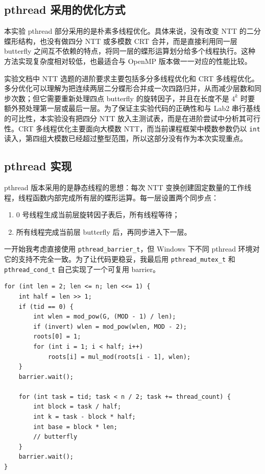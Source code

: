 \documentclass[a4paper,12pt]{ctexart}
\begin{document}
\subsection{pthread 采用的优化方式}

本实验 pthread 部分采用的是朴素多线程优化。具体来说，没有改变 NTT 的二分蝶形结构，也没有做四分 NTT 或多模数 CRT 合并，而是直接利用同一层 butterfly 之间互不依赖的特点，将同一层的蝶形运算划分给多个线程执行。这种方法实现复杂度相对较低，也最适合与 OpenMP 版本做一一对应的性能比较。

实验文档中 NTT 选题的进阶要求主要包括多分多线程优化和 CRT 多线程优化。多分优化可以理解为把连续两层二分蝶形合并成一次四路归并，从而减少层数和同步次数；但它需要重新处理四点 butterfly 的旋转因子，并且在长度不是 $4^k$ 时要额外预处理第一层或最后一层。为了保证主实验代码的正确性和与 Lab2 串行基线的可比性，本实验没有把四分 NTT 放入主测试表，而是在进阶尝试中分析其可行性。CRT 多线程优化主要面向大模数 NTT，而当前课程框架中模数参数仍以 \texttt{int} 读入，第四组大模数已经超过整型范围，所以这部分没有作为本次实现重点。

\subsection{pthread 实现}

pthread 版本采用的是静态线程的思想：每次 NTT 变换创建固定数量的工作线程，线程函数内部完成所有层的蝶形运算。每一层设置两个同步点：
\begin{enumerate}
  \item 0 号线程生成当前层旋转因子表后，所有线程等待；
  \item 所有线程完成当前层 butterfly 后，再同步进入下一层。
\end{enumerate}

一开始我考虑直接使用 \texttt{pthread\_barrier\_t}，但 Windows 下不同 pthread 环境对它的支持不完全一致。为了让代码更稳妥，我最后用 \texttt{pthread\_mutex\_t} 和 \texttt{pthread\_cond\_t} 自己实现了一个可复用 barrier。

\begin{lstlisting}[title=pthread 工作线程核心]
for (int len = 2; len <= n; len <<= 1) {
    int half = len >> 1;
    if (tid == 0) {
        int wlen = mod_pow(G, (MOD - 1) / len);
        if (invert) wlen = mod_pow(wlen, MOD - 2);
        roots[0] = 1;
        for (int i = 1; i < half; i++)
            roots[i] = mul_mod(roots[i - 1], wlen);
    }
    barrier.wait();

    for (int task = tid; task < n / 2; task += thread_count) {
        int block = task / half;
        int k = task - block * half;
        int base = block * len;
        // butterfly
    }
    barrier.wait();
}
\end{lstlisting}
\end{document}
